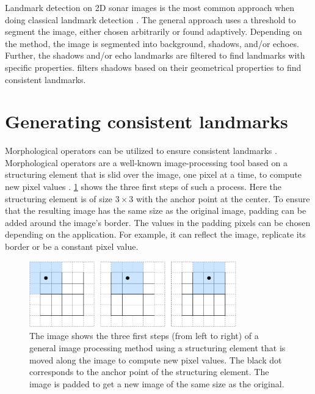 Landmark detection on 2D sonar images is the most common approach when doing classical landmark detection \cite{Wang2017UnderwaterSonar, Siantidis2016SideVehicles, Yuan2016AnNavigation, Leblond2019SonarProject}. The general approach uses a threshold to segment the image, either chosen arbitrarily or found adaptively. Depending on the method, the image is segmented into background, shadows, and/or echoes. Further, the shadows and/or echo landmarks are filtered to find landmarks with specific properties. \cite{Leblond2019SonarProject} filters shadows based on their geometrical properties to find consistent landmarks. 

\section{Generating consistent landmarks}

Morphological operators can be utilized to ensure consistent landmarks \cite{Yuan2016AnNavigation}. Morphological operators are a well-known image-processing tool based on a structuring element that is slid over the image, one pixel at a time, to compute new pixel values \cite{Gonzalez2018DigitalProcessing}. \cref{fig:image_processing_basics} shows the three first steps of such a process. Here the structuring element is of size $3\times3$ with the anchor point at the center. To ensure that the resulting image has the same size as the original image, padding can be added around the image's border. The values in the padding pixels can be chosen depending on the application. For example, it can reflect the image, replicate its border or be a constant pixel value.  

\begin{figure}
    \centering
    \includegraphics[width=0.8\textwidth]{figures/Image_processing_essentials.drawio.pdf}
    \caption{The image shows the three first steps (from left to right) of a general image processing method using a structuring element that is moved along the image to compute new pixel values. The black dot corresponds to the anchor point of the structuring element. The image is padded to get a new image of the same size as the original.}
    \label{fig:image_processing_basics}
\end{figure}


